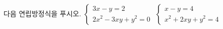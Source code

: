 다음 연립방정식을 푸시오.
 $\begin{cases} 3x-y=2 \\ 2x^2-3xy+y^2=0 \end{cases}$
 $\begin{cases} x-y=4 \\ x^2+2xy+y^2=4 \end{cases}$
